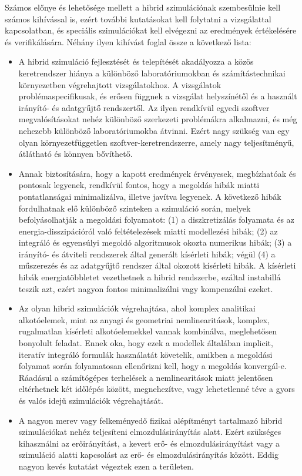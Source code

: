 Számos előnye és lehetősége mellett a hibrid szimulációnak szembesülnie kell számos kihívással is, ezért további kutatásokat kell folytatni a vizsgálattal kapcsolatban, és  speciális szimulációkat kell elvégezni az eredmények értékelésére és verifikálására. Néhány ilyen kihívást foglal össze a következő lista:
\begin{itemize}
\item A hibrid szimuláció fejlesztését és telepítését akadályozza a közös keretrendszer hiánya a  különböző laboratóriumokban és számítástechnikai környezetben végrehajtott vizsgálatokhoz. A vizsgálatok problémaspecifikusak, és erősen függnek a vizsgálat helyszínétől és a használt irányító- és adatgyűjtő rendszertől. Az ilyen rendkívül egyedi szoftver megvalósításokat nehéz különböző szerkezeti problémákra alkalmazni, és még nehezebb különböző laboratóriumokba átvinni. Ezért nagy szükség van egy olyan környezetfüggetlen szoftver-keretrendszerre, amely nagy teljesítményű, átlátható és könnyen bővíthető.
\item Annak biztosítására, hogy a kapott eredmények érvényesek, megbízhatóak és pontosak legyenek, rendkívül fontos, hogy a megoldás hibák miatti pontatlanságai minimalizálva, illetve javítva legyenek. A következő hibák fordulhatnak elő különböző szinteken a szimuláció során, melyek befolyásolhatják a megoldási folyamatot: (1) a diszkretizálás folyamata és az energia-disszipációról való feltételezések  miatti modellezési hibák; (2) az integráló és egyensúlyi megoldó algoritmusok okozta numerikus hibák; (3) a irányító- és átviteli rendszerek által generált kísérleti hibák; végül (4) a műszerezés és az adatgyűjtő rendszer által okozott kísérleti hibák. A kísérleti hibák energiatöbbletet vezethetnek a hibrid rendszerbe, ezáltal instabillá teszik azt,  ezért nagyon fontos minimalizálni vagy kompenzálni ezeket.
\item Az olyan hibrid szimulációk végrehajtása, ahol komplex analitikai alkotóelemek, mint az anyagi és geometriai nemlinearitások,  komplex,  rugalmatlan kísérleti alkotóelemekkel vannak kombinálva, meglehetősen bonyolult feladat. Ennek oka, hogy ezek a modellek általában implicit, iteratív integráló formulák használatát követelik, amikben a megoldási folyamat során folyamatosan ellenőrizni  kell, hogy a megoldás konvergál-e. Ráadásul a számítógépes terhelések a nemlinearitások miatt jelentősen eltérhetnek két időlépés között, megnehezítve, vagy lehetetlenné téve  a  gyors és valós idejű szimulációk végrehajtását.
\item A nagyon merev vagy felkeményedő fizikai alépítményt tartalmazó hibrid szimulációkat nehéz teljesíteni elmozdulásirányítás alatt. Ezért szükséges kihasználni az erőirányítást, a kevert erő- és elmozdulásirányítást vagy a szimuláció alatti kapcsolást az erő- és elmozdulásirányítás között. Eddig nagyon kevés kutatást végeztek ezen a területen.

\end{itemize}
